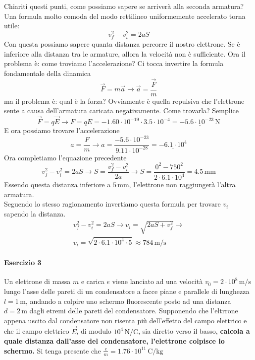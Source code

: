 Chiariti questi punti, come possiamo sapere se arriverà alla seconda armatura? Una formula molto 
comoda del modo rettilineo uniformemente accelerato torna utile:
\begin{equation*}
v_f^2 - v_i^2 = 2aS
\end{equation*}
Con questa possiamo sapere quanta distanza percorre il nostro elettrone. Se è inferiore alla distanza
tra le armature, allora la velocità non è sufficiente. Ora il problema è: come troviamo 
l'accelerazione? Ci tocca invertire la formula fondamentale della dinamica
\begin{equation*}
\vec{F} = m\vec{a} \rightarrow \vec{a} = \frac{\vec{F}}{m}
\end{equation*}
ma il problema è: qual è la forza? Ovviamente è quella repulsiva che l'elettrone sente a causa 
dell'armatura caricata negativamente. Come trovarla? Semplice
\begin{equation*}
\vec{F} = q\vec{E} \rightarrow F = qE = -1.60\cdot10^{-19}\cdot3.5\cdot10^{-4} = 
\underline{-5.6\cdot10^{-23}\,\text{N}}
\end{equation*}
E ora possiamo trovare l'accelerazione
\begin{equation*}
a = \frac{F}{m} \rightarrow a = \frac{-5.6\cdot10^{-23}}{9.11\cdot10^{-28}} = 
\underline{-6.1\cdot10^4}
\end{equation*}
Ora completiamo l'equazione precedente
\begin{equation*}
v_f^2 - v_i^2 = 2aS \rightarrow S = \frac{v_f^2 - v_i^2}{2a} \rightarrow 
S = \frac{0^2 - 750^2}{2\cdot6.1\cdot10^4} = \boxed{4.5\,\text{mm}}
\end{equation*}
Essendo questa distanza inferiore a $5\,\text{mm}$, l'elettrone non raggiungerà l'altra armatura.\\
Seguendo lo stesso ragionamento invertiamo questa formula per trovare $v_i$ sapendo la distanza.
\begin{align*}
v_f^2 - v_i^2 = 2aS \rightarrow v_i = \sqrt{2aS + v_f^2} \rightarrow \\
v_i = \sqrt{2\cdot6.1\cdot10^4\cdot5} \approx \boxed{784\,\text{m/s}}
\end{align*}

\paragraph{Esercizio 3}
Un elettrone di massa $m$ e carica $e$ viene lanciato ad una velocità $v_0=2\cdot10^8\,\text{m/s}$
lungo l'asse delle pareti di un condensatore a facce piane e parallele di lunghezza $l=1\,\text{m}
$, andando a colpire uno schermo fluorescente posto ad una distanza $d=2\,\text{m}$ dagli etremi 
delle pareti del condensatore. Supponendo che l'eltrrone appena uscito dal condensatore non
risenta più dell'effetto del campo elettrico e che il campo elettrico $\vec{E}$, di modulo
$10^4\,\text{N/C}$, sia diretto verso il basso, \textbf{calcola a quale distanza dall'asse del
condensatore, l'elettrone colpisce lo schermo.} Si tenga presente che 
$\frac{e}{m}=1.76\cdot10^{11}\,\text{C/kg}$
\divisor

